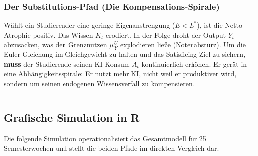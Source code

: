 \documentclass[
  ngerman,
  letterpaper,
  DIV=11]{scrartcl}
\begin{document}
\subsubsection{Der Substitutions-Pfad (Die
Kompensations-Spirale)}\label{der-substitutions-pfad-die-kompensations-spirale}

Wählt ein Studierender eine geringe Eigenanstrengung (\(E < E^*\)), ist
die Netto-Atrophie positiv. Das Wissen \(K_t\) erodiert. In der Folge
droht der Output \(Y_t\) abzusacken, was den Grenznutzen
\(\mu \frac{U}{Y}\) explodieren ließe (Notenabsturz). Um die
Euler-Gleichung im Gleichgewicht zu halten und das Satisficing-Ziel zu
sichern, \textbf{muss} der Studierende seinen KI-Konsum \(A_t\)
kontinuierlich erhöhen. Er gerät in eine Abhängigkeitsspirale: Er nutzt
mehr KI, nicht weil er produktiver wird, sondern um seinen endogenen
Wissensverfall zu kompensieren.

\begin{center}\rule{0.5\linewidth}{0.5pt}\end{center}

\subsection{Grafische Simulation in R}\label{grafische-simulation-in-r}

Die folgende Simulation operationalisiert das Gesamtmodell für 25
Semesterwochen und stellt die beiden Pfade im direkten Vergleich dar.
\end{document}
